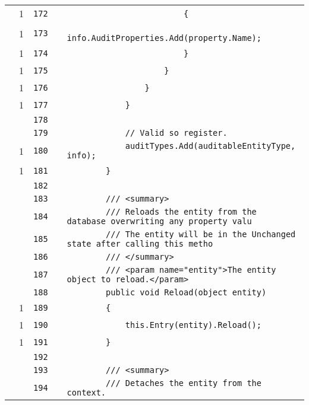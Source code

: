 \documentclass[a4paper,10pt]{article}
\begin{document}
\begin{longtable}[l]{lrrll}
\cellcolor{green} & 1 & \verb~172~ & & \verb~                        {~\\
\cellcolor{green} & 1 & \verb~173~ & & \verb~                            info.AuditProperties.Add(property.Name);~\\
\cellcolor{green} & 1 & \verb~174~ & & \verb~                        }~\\
\cellcolor{green} & 1 & \verb~175~ & & \verb~                    }~\\
\cellcolor{green} & 1 & \verb~176~ & & \verb~                }~\\
\cellcolor{green} & 1 & \verb~177~ & & \verb~            }~\\
\cellcolor{gray} &  & \verb~178~ & & \verb~~\\
\cellcolor{gray} &  & \verb~179~ & & \verb~            // Valid so register.~\\
\cellcolor{green} & 1 & \verb~180~ & & \verb~            auditTypes.Add(auditableEntityType, info);~\\
\cellcolor{green} & 1 & \verb~181~ & & \verb~        }~\\
\cellcolor{gray} &  & \verb~182~ & & \verb~~\\
\cellcolor{gray} &  & \verb~183~ & & \verb~        /// <summary>~\\
\cellcolor{gray} &  & \verb~184~ & & \verb~        /// Reloads the entity from the database overwriting any property valu~\\
\cellcolor{gray} &  & \verb~185~ & & \verb~        /// The entity will be in the Unchanged state after calling this metho~\\
\cellcolor{gray} &  & \verb~186~ & & \verb~        /// </summary>~\\
\cellcolor{gray} &  & \verb~187~ & & \verb~        /// <param name="entity">The entity object to reload.</param>~\\
\cellcolor{gray} &  & \verb~188~ & & \verb~        public void Reload(object entity)~\\
\cellcolor{green} & 1 & \verb~189~ & & \verb~        {~\\
\cellcolor{green} & 1 & \verb~190~ & & \verb~            this.Entry(entity).Reload();~\\
\cellcolor{green} & 1 & \verb~191~ & & \verb~        }~\\
\cellcolor{gray} &  & \verb~192~ & & \verb~~\\
\cellcolor{gray} &  & \verb~193~ & & \verb~        /// <summary>~\\
\cellcolor{gray} &  & \verb~194~ & & \verb~        /// Detaches the entity from the context.~\\

\end{longtable}
\end{document}
